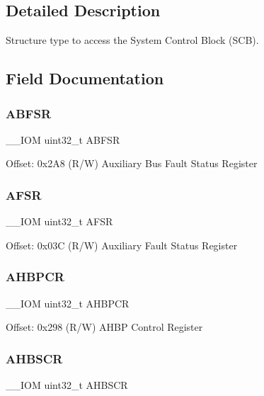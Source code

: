 \subsection{Detailed Description}
Structure type to access the System Control Block (S\+CB). 

\subsection{Field Documentation}
\mbox{\label{struct_s_c_b___type_aa104b9e01b129abe3de43c439916f655}} 
\subsubsection{\texorpdfstring{ABFSR}{ABFSR}}
{\footnotesize\ttfamily \+\_\+\+\_\+\+I\+OM uint32\+\_\+t A\+B\+F\+SR}

Offset\+: 0x2\+A8 (R/W) Auxiliary Bus Fault Status Register \mbox{\label{struct_s_c_b___type_a3ef0057e48fdef798f2ee12125a80d9f}} 
\subsubsection{\texorpdfstring{AFSR}{AFSR}}
{\footnotesize\ttfamily \+\_\+\+\_\+\+I\+OM uint32\+\_\+t A\+F\+SR}

Offset\+: 0x03C (R/W) Auxiliary Fault Status Register \mbox{\label{struct_s_c_b___type_a209b4026c2994d0e18e883aa9af5c3cc}} 
\subsubsection{\texorpdfstring{AHBPCR}{AHBPCR}}
{\footnotesize\ttfamily \+\_\+\+\_\+\+I\+OM uint32\+\_\+t A\+H\+B\+P\+CR}

Offset\+: 0x298 (R/W) A\+H\+BP Control Register \mbox{\label{struct_s_c_b___type_a25bb4ac449a4122217e2ca74b9ad4e3e}} 
\subsubsection{\texorpdfstring{AHBSCR}{AHBSCR}}
{\footnotesize\ttfamily \+\_\+\+\_\+\+I\+OM uint32\+\_\+t A\+H\+B\+S\+CR}

